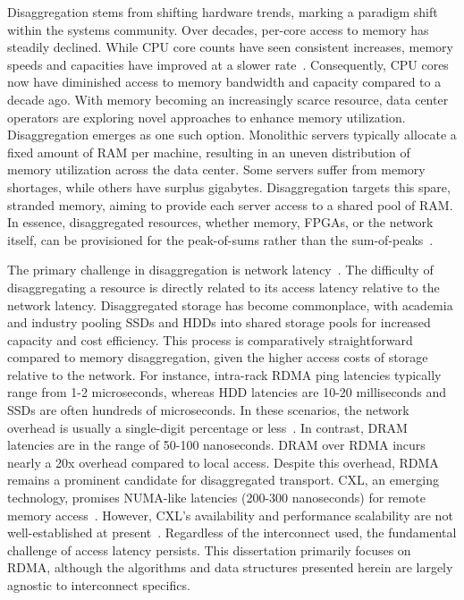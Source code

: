 \documentclass[12pt]{ucsddissertation}
\begin{document}
Disaggregation stems from shifting hardware trends, marking a paradigm shift within the systems
community. Over decades, per-core access to memory has steadily declined. While CPU core counts have
seen consistent increases, memory speeds and capacities have improved at a slower
rate~\cite{micron-memorywall}. Consequently, CPU cores now have diminished access to memory
bandwidth and capacity compared to a decade ago. With memory becoming an increasingly scarce
resource, data center operators are exploring novel approaches to enhance memory utilization.
Disaggregation emerges as one such option.  Monolithic servers typically allocate a fixed amount of
RAM per machine, resulting in an uneven distribution of memory utilization across the data center.
Some servers suffer from memory shortages, while others have surplus gigabytes. Disaggregation
targets this spare, stranded memory, aiming to provide each server access to a shared pool of RAM.
In essence, disaggregated resources, whether memory, FPGAs, or the network itself, can be
provisioned for the peak-of-sums rather than the sum-of-peaks~\cite{clio,supernic,dsnf}.


The primary challenge in disaggregation is network latency~\cite{requirements}. The difficulty of
disaggregating a resource is directly related to its access latency relative to the network latency.
Disaggregated storage has become commonplace, with academia and industry pooling SSDs and HDDs into
shared storage pools for increased capacity and cost efficiency. This process is comparatively
straightforward compared to memory disaggregation, given the higher access costs of storage relative
to the network.
For instance, intra-rack RDMA ping latencies typically range from 1-2 microseconds, whereas HDD
latencies are 10-20 milliseconds and SSDs are often hundreds of microseconds. In these scenarios,
the network overhead is usually a single-digit percentage or less~\cite{decible}. In contrast, DRAM
latencies are in the range of 50-100 nanoseconds. DRAM over RDMA incurs nearly a 20x overhead
compared to local access. Despite this overhead, RDMA remains a prominent candidate for
disaggregated transport.
CXL, an emerging technology, promises NUMA-like latencies (200-300 nanoseconds) for remote memory
access~\cite{cxl}. However, CXL's availability and performance scalability are not well-established
at present~\cite{direct-cxl,pond,cxl-demyst}. Regardless of the interconnect used, the fundamental
challenge of access latency persists. This dissertation primarily focuses on RDMA, although the
algorithms and data structures presented herein are largely agnostic to interconnect specifics.
\end{document}
